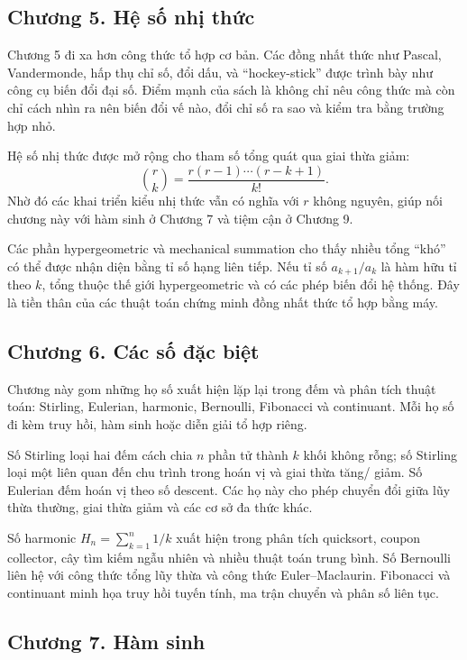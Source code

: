 \documentclass[11pt]{article}
\begin{document}
\subsection*{Chương 5. Hệ số nhị thức}

Chương 5 đi xa hơn công thức tổ hợp cơ bản. Các đồng nhất thức như Pascal,
Vandermonde, hấp thụ chỉ số, đổi dấu, và ``hockey-stick'' được trình bày như
công cụ biến đổi đại số. Điểm mạnh của sách là không chỉ nêu công thức mà còn
chỉ cách nhìn ra nên biến đổi vế nào, đổi chỉ số ra sao và kiểm tra bằng trường
hợp nhỏ.

Hệ số nhị thức được mở rộng cho tham số tổng quát qua giai thừa giảm:
\[
  \binom{r}{k}=\frac{r(r-1)\cdots(r-k+1)}{k!}.
\]
Nhờ đó các khai triển kiểu nhị thức vẫn có nghĩa với \(r\) không nguyên, giúp
nối chương này với hàm sinh ở Chương 7 và tiệm cận ở Chương 9.

Các phần hypergeometric và mechanical summation cho thấy nhiều tổng ``khó''
có thể được nhận diện bằng tỉ số hạng liên tiếp. Nếu tỉ số
\(a_{k+1}/a_k\) là hàm hữu tỉ theo \(k\), tổng thuộc thế giới hypergeometric
và có các phép biến đổi hệ thống. Đây là tiền thân của các thuật toán chứng
minh đồng nhất thức tổ hợp bằng máy.

\subsection*{Chương 6. Các số đặc biệt}

Chương này gom những họ số xuất hiện lặp lại trong đếm và phân tích thuật
toán: Stirling, Eulerian, harmonic, Bernoulli, Fibonacci và continuant. Mỗi họ
số đi kèm truy hồi, hàm sinh hoặc diễn giải tổ hợp riêng.

Số Stirling loại hai đếm cách chia \(n\) phần tử thành \(k\) khối không rỗng;
số Stirling loại một liên quan đến chu trình trong hoán vị và giai thừa tăng/
giảm. Số Eulerian đếm hoán vị theo số descent. Các họ này cho phép chuyển đổi
giữa lũy thừa thường, giai thừa giảm và các cơ sở đa thức khác.

Số harmonic \(H_n=\sum_{k=1}^n 1/k\) xuất hiện trong phân tích quicksort,
coupon collector, cây tìm kiếm ngẫu nhiên và nhiều thuật toán trung bình. Số
Bernoulli liên hệ với công thức tổng lũy thừa và công thức Euler--Maclaurin.
Fibonacci và continuant minh họa truy hồi tuyến tính, ma trận chuyển và phân
số liên tục.

\subsection*{Chương 7. Hàm sinh}
\end{document}
